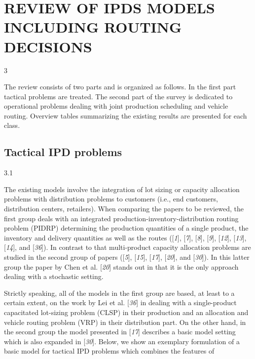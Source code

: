 \section*{REVIEW OF IPDS MODELS INCLUDING ROUTING DECISIONS}3\par The review consists of two parts and is organized as follows. In the first part tactical
 problems are treated. The second part of the survey is dedicated to operational problems
 dealing with joint production scheduling and vehicle routing. Overview tables
 summarizing the existing results are presented for each class.\subsection*{Tactical IPD problems}3.1\par The existing models involve the integration of lot sizing or capacity allocation
 problems with distribution problems to customers (i.e., end customers, distribution
 centers, retailers). When comparing the papers to be reviewed, the first group deals
 with an integrated production-inventory-distribution routing problem (PIDRP)
 determining the production quantities of a single product, the inventory and delivery
 quantities as well as the routes ([\textit{1}], [\textit{7}], [\textit{8}],
 [\textit{9}], [\textit{12}], [\textit{13}], [\textit{14}], and [\textit{36}]). In
 contrast to that multi-product capacity allocation problems are studied in the second
 group of papers ([\textit{5}], [\textit{15}], [\textit{17}], [\textit{20}], and [\textit{30}]). In this latter group the paper by Chen et al. [\textit{20}] stands out in that it is the only approach dealing with a
 stochastic setting.\par Strictly speaking, all of the models in the first group are based, at least to a
 certain extent, on the work by Lei et al. [\textit{36}]
 in dealing with a single-product capacitated lot-sizing problem (CLSP) in their
 production and an allocation and vehicle routing problem (VRP) in their distribution
 part. On the other hand, in the second group the model presented in [\textit{17}] describes a basic model setting which is also
 expanded in [\textit{30}]. Below, we show an exemplary
 formulation of a basic model for tactical IPD problems which combines the features of
